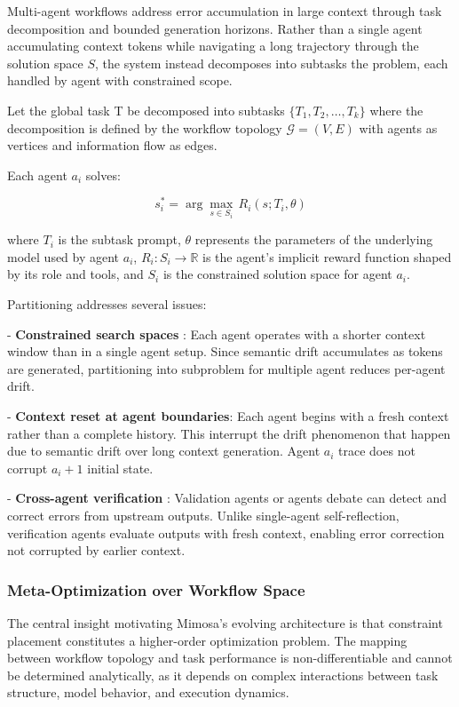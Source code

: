 \documentclass{article}
\begin{document}
Multi-agent workflows address error accumulation in large context through task decomposition and bounded generation horizons. Rather than a single agent accumulating context tokens while navigating a long trajectory through the solution space $S$, the system instead decomposes into subtasks the problem, each handled by agent with constrained scope.

Let the global task T be decomposed into subtasks $\{T_1, T_2, \ldots, T_k\}$ where the decomposition is defined by the workflow topology $\mathcal{G} = (V, E)$ with agents as vertices and information flow as edges.

Each agent $a_i$ solves:

$$s_i^* = \arg\max_{s \in S_i} \, R_i(s; T_i, \theta)$$

where $T_i$ is the subtask prompt, $\theta$ represents the parameters of the underlying model used by agent $a_i$, $R_i: S_i \to \mathbb{R}$ is the agent's implicit reward function shaped by its role and tools, and $S_i$ is the constrained solution space for agent $a_i$.

Partitioning addresses several issues:

- \textbf{Constrained search spaces} : Each agent operates with a shorter context window than in a single agent setup. Since semantic drift accumulates as tokens are generated, partitioning into subproblem for multiple agent reduces per-agent drift.

- \textbf{Context reset at agent boundaries}: Each agent begins with a fresh context rather than a complete history. This interrupt the drift phenomenon that happen due to semantic drift over long context generation. Agent $a_i$ trace does not corrupt $a_i+1$ initial state.

- \textbf{Cross-agent verification} : Validation agents or agents debate can detect and correct errors from upstream outputs. Unlike single-agent self-reflection, verification agents evaluate outputs with fresh context, enabling error correction not corrupted by earlier context.

\subsubsection{Meta-Optimization over Workflow Space}

The central insight motivating Mimosa's evolving architecture is that constraint placement constitutes a higher-order optimization problem. The mapping between workflow topology and task performance is non-differentiable and cannot be determined analytically, as it depends on complex interactions between task structure, model behavior, and execution dynamics.
\end{document}
